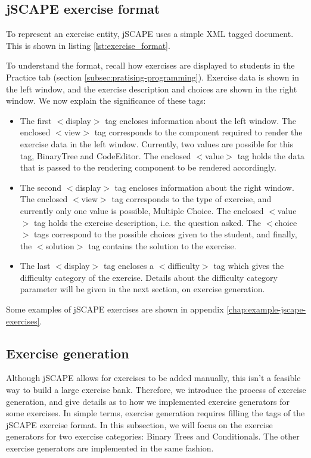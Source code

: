 \subsection{jSCAPE exercise format}
\label{subsec:jscape-exercise-format}
To represent an exercise entity, jSCAPE uses a simple XML tagged document. This is shown in listing \ref{lst:exercise_format}.\newline



To understand the format, recall how exercises are displayed to students in the Practice tab (section \ref{subsec:pratising-programming}). Exercise data is shown in the left window, and the exercise description and choices are shown in the right window.
We now explain the significance of these tags:
\begin{itemize}
\item The first \textsf{$<$display$>$} tag encloses information about the left window. The enclosed \textsf{$<$view$>$} tag corresponds to the component required to render the exercise data in the left window. Currently, two values are possible for this tag, \textsf{BinaryTree} and \textsf{CodeEditor}. The enclosed \textsf{$<$value$>$} tag holds the data that is passed to the rendering component to be rendered accordingly.
\item The second \textsf{$<$display$>$} tag encloses information about the right window. The enclosed \textsf{$<$view$>$} tag corresponds to the type of exercise, and currently only one value is possible, \textsf{Multiple Choice}. The enclosed \textsf{$<$value$>$} tag holds the exercise description, i.e. the question asked. The \textsf{$<$choice$>$} tags correspond to the possible choices given to the student, and finally, the \textsf{$<$solution$>$} tag contains the solution to the exercise.
\item The last \textsf{$<$display$>$} tag encloses a \textsf{$<$difficulty$>$} tag which gives the difficulty category of the exercise. Details about the difficulty category parameter will be given in the next section, on exercise generation.
\end{itemize}

Some examples of jSCAPE exercises are shown in appendix \ref{chap:example-jscape-exercises}.

\subsection{Exercise generation}
\label{subsec:exercise-generation}
Although jSCAPE allows for exercises to be added manually, this isn't a feasible way to build a large exercise bank. Therefore, we introduce the process of exercise generation, and give details as to how we implemented exercise generators for some exercises. In simple terms, exercise generation requires filling the tags of the jSCAPE exercise format. In this subsection, we will focus on the exercise generators for two exercise categories: Binary Trees and Conditionals. The other exercise generators are implemented in the same fashion.

